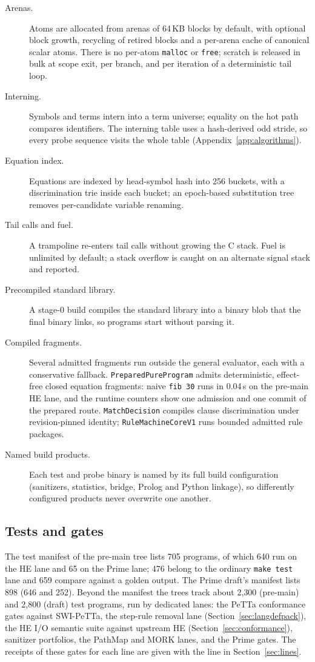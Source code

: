 \documentclass[11pt]{article}
\newcommand{\code}[1]{\texttt{#1}}
\newcommand{\PeTTa}{\textup{PeTTa}}
\newcommand{\HE}{\textup{HE}}
\newcommand{\PathMap}{\textup{PathMap}}
\begin{document}
\begin{description}
\item[Arenas.] Atoms are allocated from arenas of 64\,KB blocks by default,
  with optional block growth, recycling of retired blocks and a per-arena
  cache of canonical scalar atoms.  There is no per-atom \code{malloc} or
  \code{free}; scratch is released in bulk at scope exit, per branch, and per
  iteration of a deterministic tail loop.
\item[Interning.] Symbols and terms intern into a term universe; equality on
  the hot path compares identifiers.  The interning table uses a
  hash-derived odd stride, so every probe sequence visits the whole table
  (Appendix~\ref{app:algorithms}).
\item[Equation index.] Equations are indexed by head-symbol hash into 256
  buckets, with a discrimination trie inside each bucket; an epoch-based
  substitution tree removes per-candidate variable renaming.
\item[Tail calls and fuel.] A trampoline re-enters tail calls without growing
  the C stack.  Fuel is unlimited by default; a stack overflow is caught on an
  alternate signal stack and reported.
\item[Precompiled standard library.] A stage-0 build compiles the standard
  library into a binary blob that the final binary links, so programs start
  without parsing it.
\item[Compiled fragments.] Several admitted fragments run outside the general
  evaluator, each with a conservative fallback.  \code{PreparedPureProgram}
  admits deterministic, effect-free closed equation fragments: naive
  \code{fib 30} runs in 0.04\,s on the pre-main \HE{} lane, and the runtime
  counters show one admission and one commit of the prepared route.
  \code{MatchDecision} compiles clause discrimination under revision-pinned
  identity; \code{RuleMachineCoreV1} runs bounded admitted rule packages.
\item[Named build products.] Each test and probe binary is named by its full
  build configuration (sanitizers, statistics, bridge, Prolog and Python
  linkage), so differently configured products never overwrite one another.
\end{description}

\subsection{Tests and gates}

The test manifest of the pre-main tree lists 705 programs, of which 640 run on
the \HE{} lane and 65 on the Prime lane; 476 belong to the ordinary
\code{make test} lane and 659 compare against a golden output.  The Prime
draft's manifest lists 898 (646 and 252).  Beyond the manifest the trees track
about 2{,}300 (pre-main) and 2{,}800 (draft) test programs, run by dedicated
lanes: the \PeTTa{} conformance gates against SWI-\PeTTa{}, the step-rule
removal lane (Section~\ref{sec:langdefpack}), the \HE{} I/O semantic suite
against upstream \HE{} (Section~\ref{sec:conformance}), sanitizer portfolios,
the \PathMap{} and MORK lanes, and the Prime gates.  The receipts of these
gates for each line are given with the line in Section~\ref{sec:lines}.
\end{document}

